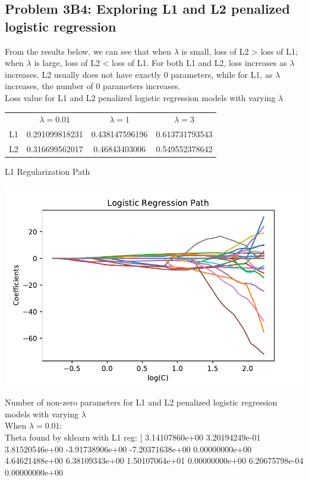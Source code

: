 \documentclass[12pt]{article}
\begin{document}
\subsection*{Problem 3B4: Exploring L1 and L2 penalized logistic regression}
From the results below, we can see that when $\lambda$ is small, loss of L2 > loss of L1; when $\lambda$ is large, loss of L2 < loss of L1. For both L1 and L2, loss increases as $\lambda$ increases.
L2 usually does not have exactly 0 parameters, while for L1, as $\lambda$ increases, the number of 0 parameters increases.\\
Loss value for L1 and L2 penalized logistic regression models with varying $\lambda$
\begin{center}
\begin{tabular}{ c c c c}
  &  $\lambda = 0.01 $& $\lambda = 1$& $\lambda = 3$\\ 
L1 & 0.291099818231 & 0.438147596196 & 0.613731793543 \\  
L2 & 0.316699562017 & 0.46843403006 & 0.549552378642  
\end{tabular}
\end{center}
L1 Regularization Path
\begin{center}
	\includegraphics[scale=0.5]{fig5}
\end{center}
Number of non-zero parameters for L1 and L2 penalized logistic regression models with varying $\lambda$\\[0.5cm]
When $\lambda = 0.01 $:\\
Theta found by sklearn with L1 reg:  [  3.14107860e+00   3.20194249e-01   3.81520546e+00  -3.91738906e+00
  -7.20371638e+00   0.00000000e+00   4.64621488e+00   6.38109343e+00
   1.50107064e+01   0.00000000e+00   6.20675798e-04   0.00000000e+00
\end{document}

